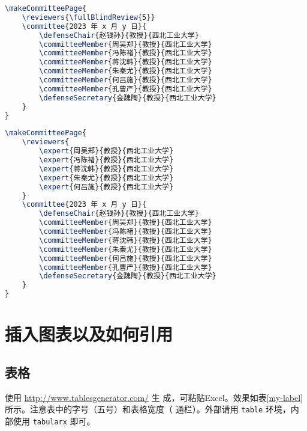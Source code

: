 \documentclass[lang=chs, degree=phd, blindreview=false, winfonts=true]{ya-npu/yanputhesis}
\theoremstyle{plain}%
\theoremstyle{remark}%
\begin{document}
\begin{lstlisting}[language={TeX}, label={code:makeBlindReviewerCommitteePage},
    caption={盲评样例 makeBlindReviewerCommitteePage.tex}]
\makeCommitteePage{
    \reviewers{\fullBlindReview{5}}
    \committee{2023 年 x 月 y 日}{
        \defenseChair{赵钱孙}{教授}{西北工业大学}
        \committeeMember{周吴郑}{教授}{西北工业大学}
        \committeeMember{冯陈褚}{教授}{西北工业大学}
        \committeeMember{蒋沈韩}{教授}{西北工业大学}
        \committeeMember{朱秦尤}{教授}{西北工业大学}
        \committeeMember{何吕施}{教授}{西北工业大学}
        \committeeMember{孔曹严}{教授}{西北工业大学}
        \defenseSecretary{金魏陶}{教授}{西北工业大学}
    }
}
\end{lstlisting}

\begin{lstlisting}[language={TeX}, label={code:makeOpenReviewerCommitteePage},
    caption={明审样例 makeOpenReviewerCommitteePage.tex}]
\makeCommitteePage{
    \reviewers{
        \expert{周吴郑}{教授}{西北工业大学}
        \expert{冯陈褚}{教授}{西北工业大学}
        \expert{蒋沈韩}{教授}{西北工业大学}
        \expert{朱秦尤}{教授}{西北工业大学}
        \expert{何吕施}{教授}{西北工业大学}
    }
    \committee{2023 年 x 月 y 日}{
        \defenseChair{赵钱孙}{教授}{西北工业大学}
        \committeeMember{周吴郑}{教授}{西北工业大学}
        \committeeMember{冯陈褚}{教授}{西北工业大学}
        \committeeMember{蒋沈韩}{教授}{西北工业大学}
        \committeeMember{朱秦尤}{教授}{西北工业大学}
        \committeeMember{何吕施}{教授}{西北工业大学}
        \committeeMember{孔曹严}{教授}{西北工业大学}
        \defenseSecretary{金魏陶}{教授}{西北工业大学}
    }
}
\end{lstlisting}

\cleardoublepage

\chapter{插入图表以及如何引用}

\section{表格}

使用 \href{http://www.tablesgenerator.com/}{http://www.tablesgenerator.com/} 生
成，可粘贴Excel。效果如表\ref{my-label}所示。注意表中的字号（五号）和表格宽度（
通栏）。外部请用 \lstinline`table` 环境，内部使用 \lstinline`tabularx` 即可。
\end{document}
